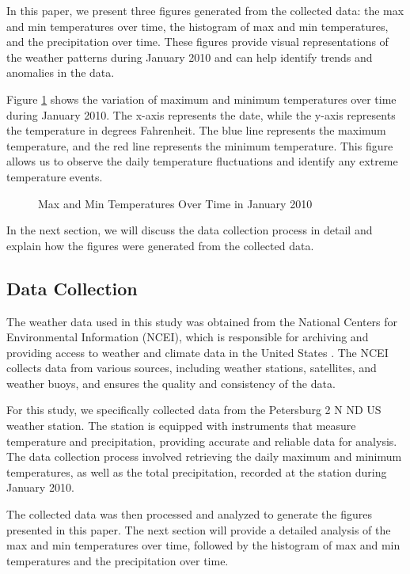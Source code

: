 \documentclass{article}
\begin{document}
In this paper, we present three figures generated from the collected data: the max and min temperatures over time, the histogram of max and min temperatures, and the precipitation over time. These figures provide visual representations of the weather patterns during January 2010 and can help identify trends and anomalies in the data.

Figure \ref{fig:temp_over_time} shows the variation of maximum and minimum temperatures over time during January 2010. The x-axis represents the date, while the y-axis represents the temperature in degrees Fahrenheit. The blue line represents the maximum temperature, and the red line represents the minimum temperature. This figure allows us to observe the daily temperature fluctuations and identify any extreme temperature events.

\begin{figure}[h]
  \centering
  \caption{Max and Min Temperatures Over Time in January 2010}
  \label{fig:temp_over_time}
\end{figure}

In the next section, we will discuss the data collection process in detail and explain how the figures were generated from the collected data.

\subsection{Data Collection}

The weather data used in this study was obtained from the National Centers for Environmental Information (NCEI), which is responsible for archiving and providing access to weather and climate data in the United States \cite{ncei}. The NCEI collects data from various sources, including weather stations, satellites, and weather buoys, and ensures the quality and consistency of the data.

For this study, we specifically collected data from the Petersburg 2 N ND US weather station. The station is equipped with instruments that measure temperature and precipitation, providing accurate and reliable data for analysis. The data collection process involved retrieving the daily maximum and minimum temperatures, as well as the total precipitation, recorded at the station during January 2010.

The collected data was then processed and analyzed to generate the figures presented in this paper. The next section will provide a detailed analysis of the max and min temperatures over time, followed by the histogram of max and min temperatures and the precipitation over time.
\end{document}
